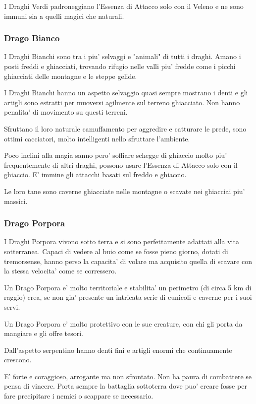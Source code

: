 \documentclass[a4paper,11pt,twoside,openany]{book}
\begin{document}
I Draghi Verdi padroneggiano l'Essenza di Attacco solo con il Veleno e ne sono immuni sia a quelli magici che naturali.

\subsubsection{Drago Bianco} 

I Draghi Bianchi sono tra i piu' selvaggi e "animali" di tutti i draghi.
Amano i posti freddi e ghiacciati, trovando rifugio nelle valli piu' fredde come i picchi ghiacciati delle montagne e le steppe gelide.

I Draghi Bianchi hanno un aspetto selvaggio quasi sempre mostrano i denti e gli artigli sono estratti per muoversi agilmente sul terreno ghiacciato.
Non hanno penalita' di movimento su questi terreni.

Sfruttano il loro naturale camuffamento per aggredire e catturare le prede, sono ottimi cacciatori, molto intelligenti nello sfruttare l'ambiente.

Poco inclini alla magia sanno pero' soffiare schegge di ghiaccio molto piu' frequentemente di altri draghi, possono usare l'Essenza di Attacco solo con il ghiaccio. E' immine gli attacchi basati sul freddo e ghiaccio.

Le loro tane sono caverne ghiacciate nelle montagne o scavate nei ghiacciai piu' massici.


\subsubsection{Drago Porpora} 

I Draghi Porpora vivono sotto terra e si sono perfettamente adattati alla vita sotterranea.
Capaci di vedere al buio come se fosse pieno giorno, dotati di tremorsense, hanno perso la capacita' di volare ma acquisito quella di scavare con la stessa velocita' come se corressero.

Un Drago Porpora e' molto territoriale e stabilita' un perimetro (di circa 5 km di raggio) crea, se non gia' presente un intricata serie di cunicoli e caverne per i suoi servi.

Un Drago Porpora e' molto protettivo con le sue creature, con chi gli porta da mangiare e gli offre tesori.

Dall'aspetto serpentino hanno denti fini e artigli enormi che continuamente crescono.

E' forte e coraggioso, arrogante ma non sfrontato. Non ha paura di combattere se pensa di vincere. Porta sempre la battaglia sottoterra dove puo' creare fosse per fare precipitare i nemici o scappare se necessario.
\end{document}
